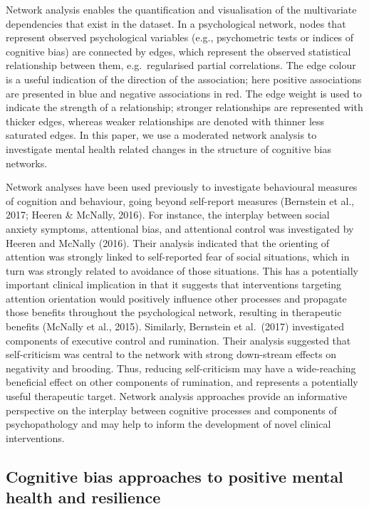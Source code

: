\documentclass[
  english,
  man,floatsintext]{apa6}
\begin{document}
Network analysis enables the quantification and visualisation of the multivariate dependencies that exist in the dataset. In a psychological network, nodes that represent observed psychological variables (e.g., psychometric tests or indices of cognitive bias) are connected by edges, which represent the observed statistical relationship between them, e.g.~regularised partial correlations. The edge colour is a useful indication of the direction of the association; here positive associations are presented in blue and negative associations in red. The edge weight is used to indicate the strength of a relationship; stronger relationships are represented with thicker edges, whereas weaker relationships are denoted with thinner less saturated edges. In this paper, we use a moderated network analysis to investigate mental health related changes in the structure of cognitive bias networks.

Network analyses have been used previously to investigate behavioural measures of cognition and behaviour, going beyond self-report measures (Bernstein et al., 2017; Heeren \& McNally, 2016). For instance, the interplay between social anxiety symptoms, attentional bias, and attentional control was investigated by Heeren and McNally (2016). Their analysis indicated that the orienting of attention was strongly linked to self-reported fear of social situations, which in turn was strongly related to avoidance of those situations. This has a potentially important clinical implication in that it suggests that interventions targeting attention orientation would positively influence other processes and propagate those benefits throughout the psychological network, resulting in therapeutic benefits (McNally et al., 2015). Similarly, Bernstein et al.~(2017) investigated components of executive control and rumination. Their analysis suggested that self-criticism was central to the network with strong down-stream effects on negativity and brooding. Thus, reducing self-criticism may have a wide-reaching beneficial effect on other components of rumination, and represents a potentially useful therapeutic target. Network analysis approaches provide an informative perspective on the interplay between cognitive processes and components of psychopathology and may help to inform the development of novel clinical interventions.

\hypertarget{cognitive-bias-approaches-to-positive-mental-health-and-resilience}{%
\subsection{Cognitive bias approaches to positive mental health and resilience}\label{cognitive-bias-approaches-to-positive-mental-health-and-resilience}}
\end{document}
